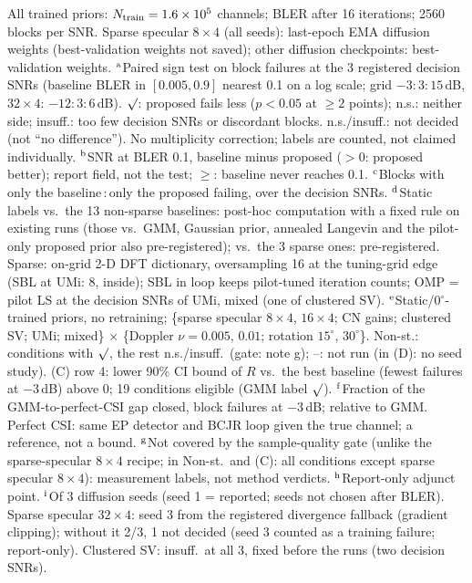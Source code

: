 \begin{table}[!t]
\vspace{2pt}
\begin{minipage}{\columnwidth}
\scriptsize
All trained priors: $N_{\rm train}=1.6\times10^5$ channels; BLER after 16 iterations; 2560 blocks per SNR. Sparse specular $8\times4$ (all seeds): last-epoch EMA diffusion weights (best-validation weights not saved); other diffusion checkpoints: best-validation weights.
$^{\rm a}$Paired sign test on block failures at the 3 registered decision SNRs (baseline BLER in $[0.005,0.9]$ nearest 0.1 on a log scale; grid $-3{:}3{:}15$\,dB, $32\times4$: $-12{:}3{:}6$\,dB). $\surd$: proposed fails less ($p<0.05$ at $\geq2$ points); n.s.: neither side; insuff.: too few decision SNRs or discordant blocks. n.s./insuff.: not decided (not ``no difference''). No multiplicity correction; labels are counted, not claimed individually.
$^{\rm b}$SNR at BLER 0.1, baseline minus proposed ($>0$: proposed better); report field, not the test; $\geq$: baseline never reaches 0.1.
$^{\rm c}$Blocks with only the baseline\,:\,only the proposed failing, over the decision SNRs.
$^{\rm d}$Static labels vs.\ the 13 non-sparse baselines: post-hoc computation with a fixed rule on existing runs (those vs.\ GMM, Gaussian prior, annealed Langevin and the pilot-only proposed prior also pre-registered); vs.\ the 3 sparse ones: pre-registered. Sparse: on-grid 2-D DFT dictionary, oversampling 16 at the tuning-grid edge (SBL at UMi: 8, inside); SBL in loop keeps pilot-tuned iteration counts; OMP = pilot LS at the decision SNRs of UMi, mixed (one of clustered SV).
$^{\rm e}$Static/0$^\circ$-trained priors, no retraining; \{sparse specular $8\times4$, $16\times4$; CN gains; clustered SV; UMi; mixed\} $\times$ \{Doppler $\nu=0.005$, $0.01$; rotation $15^\circ$, $30^\circ$\}. Non-st.: conditions with $\surd$, the rest n.s./insuff.\ (gate: note g); --: not run (in (D): no seed study). (C) row 4: lower 90\% CI bound of $R$ vs.\ the best baseline (fewest failures at $-3$\,dB) above 0; 19 conditions eligible (GMM label $\surd$).
$^{\rm f}$Fraction of the GMM-to-perfect-CSI gap closed, block failures at $-3$\,dB; relative to GMM. Perfect CSI: same EP detector and BCJR loop given the true channel; a reference, not a bound.
$^{\rm g}$Not covered by the sample-quality gate (unlike the sparse-specular $8\times4$ recipe; in Non-st.\ and (C): all conditions except sparse specular $8\times4$): measurement labels, not method verdicts. $^{\rm h}$Report-only adjunct point.
$^{\rm i}$Of 3 diffusion seeds (seed 1 = reported; seeds not chosen after BLER). Sparse specular $32\times4$: seed 3 from the registered divergence fallback (gradient clipping); without it 2/3, 1 not decided (seed 3 counted as a training failure; report-only). Clustered SV: insuff.\ at all 3, fixed before the runs (two decision SNRs).

\end{minipage}
\end{table}
